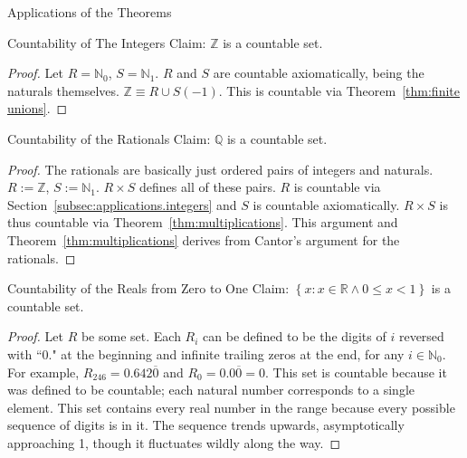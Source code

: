 \documentclass[12pt]{article}
\begin{document}
\pagebreak\begin{section}{Applications of the Theorems}\label{sec:applications}
	\vspace{-1em}\begin{subsection}{Countability of The Integers}\label{subsec:applications.integers}
		Claim: $\mathbb Z$ is a countable set.
		\begin{proof}
			Let $R=\mathbb N_0$, $S=\mathbb N_1$. $R$ and $S$ are countable axiomatically,
			being the naturals themselves. $\mathbb Z\equiv R\cup S(-1)$. This is countable
			via Theorem~\ref{thm:finite unions}.
		\end{proof}
	\end{subsection}

	\vspace{-1em}\begin{subsection}{Countability of the Rationals}\label{subsec:applications.rationals}
		Claim: $\mathbb Q$ is a countable set.
		\begin{proof}
			The rationals are basically just ordered pairs of integers and naturals.
			$R:=\mathbb Z$, $S:=\mathbb N_1$. $R\times S$ defines all of these pairs.
			$R$ is countable via Section~\ref{subsec:applications.integers} and $S$ is
			countable axiomatically. $R\times S$ is thus countable via Theorem~\ref{thm:multiplications}.
			This argument and Theorem~\ref{thm:multiplications} derives from Cantor's argument for the rationals.
		\end{proof}
	\end{subsection}

	\vspace{-1em}\begin{subsection}{Countability of the Reals from Zero to One}\label{subsec:applications.reals 0 to 1}
		Claim: $\left\{x:x\in\mathbb R\land0\le x<1\right\}$ is a countable set.
		\begin{proof}
			Let $R$ be some set. Each $R_i$ can be defined to be the digits of $i$
			reversed with ``0." at the beginning and infinite trailing zeros at the
			end, for any $i\in\mathbb N_0$. For example, $R_{246}=0.642\overline0$ and
			$R_0=0.0\overline0=0$. This set is countable because it was defined to be
			countable; each natural number corresponds to a single element. This set
			contains every real number in the range because every possible sequence
			of digits is in it. The sequence trends upwards, asymptotically approaching 1,
			though it fluctuates wildly along the way.
		\end{proof}
	\end{subsection}


\end{section}
\end{document}
